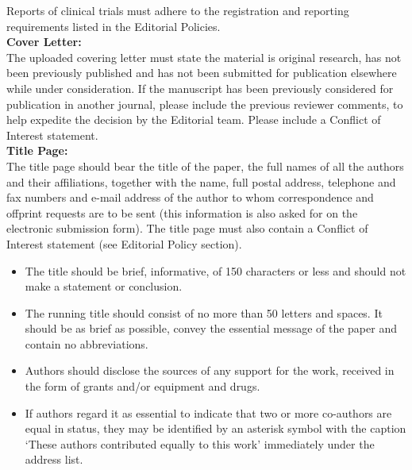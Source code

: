 \documentclass{article}
\providecommand{\tightlist}{\setlength{\itemsep}{0pt}\setlength{\parskip}{0pt}}%
\begin{document}
Reports of clinical trials must adhere to the registration and reporting
requirements listed in the Editorial Policies.\\

\textbf{Cover Letter:}\\

The uploaded covering letter must state the material is original
research, has not been previously published and has not been submitted
for publication elsewhere while under consideration. If the manuscript
has been previously considered for publication in another journal,
please include the previous reviewer comments, to help expedite the
decision by the Editorial team. Please include a Conflict of Interest
statement.\\

\textbf{Title Page:}\\

The title page should bear the title of the paper, the full names of all
the authors and their affiliations, together with the name, full postal
address, telephone and fax numbers and e-mail address of the author to
whom correspondence and offprint requests are to be sent (this
information is also asked for on the electronic submission form). The
title page must also contain a Conflict of Interest statement (see
Editorial Policy section).\\

\begin{itemize}
\tightlist
\item
  The title should be brief, informative, of 150 characters or less and
  should not make a statement or conclusion.\\
\item
  The running title should consist of no more than 50 letters and
  spaces. It should be as brief as possible, convey the essential
  message of the paper and contain no abbreviations.\\
\item
  Authors should disclose the sources of any support for the work,
  received in the form of grants and/or equipment and drugs.\\
\item
  If authors regard it as essential to indicate that two or more
  co-authors are equal in status, they may be identified by an asterisk
  symbol with the caption `These authors contributed equally to this
  work' immediately under the address list.\\
\end{itemize}
\end{document}
